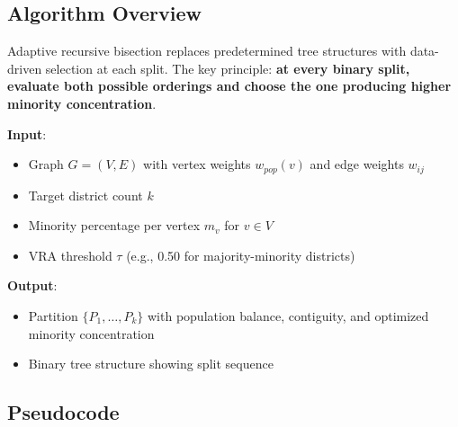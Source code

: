 \subsection{Algorithm Overview}

Adaptive recursive bisection replaces predetermined tree structures with data-driven selection at each split. The key principle: \textbf{at every binary split, evaluate both possible orderings and choose the one producing higher minority concentration}.

\textbf{Input}:
\begin{itemize}
\item Graph $G = (V, E)$ with vertex weights $w_{pop}(v)$ and edge weights $w_{ij}$
\item Target district count $k$
\item Minority percentage per vertex $m_v$ for $v \in V$
\item VRA threshold $\tau$ (e.g., 0.50 for majority-minority districts)
\end{itemize}

\textbf{Output}:
\begin{itemize}
\item Partition $\{P_1, \ldots, P_k\}$ with population balance, contiguity, and optimized minority concentration
\item Binary tree structure showing split sequence
\end{itemize}

\subsection{Pseudocode}

